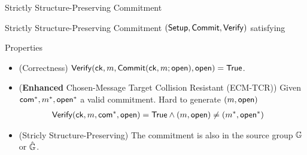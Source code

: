 \begin{frame}{Strictly Structure-Preserving Commitment~\cite{DBLP:conf/eurocrypt/AbeKOT15}}

  Strictly Structure-Preserving Commitment $({\mathsf{Setup}}, {\mathsf{Commit}}, {\mathsf{Verify}})$ satisfying \pause
  \begin{block}{Properties}
    \begin{itemize}
    \item {\color{blue}(Correctness)} ${\mathsf{Verify}}(\mathsf{ck}, m, {\mathsf{Commit}}(\mathsf{ck}, m; \mathsf{open}), \mathsf{open}) = \mathsf{True}$.
      \pause
    \item {\color{blue}(\textbf{Enhanced} Chosen-Message Target Collision Resistant (ECM-TCR))} Given $\mathsf{com}^*, m^*, \mathsf{open}^*$ a valid commitment. Hard to generate $(m, \mathsf{open})$ \st
      \begin{align*}
        {\mathsf{Verify}}(\mathsf{ck}, m, \mathsf{com}^*, \mathsf{open}) &= \mathsf{True} \wedge (m, \mathsf{open}) \neq (m^*, \mathsf{open}^*)
      \end{align*}
    \item {\color{blue}(Stricly Structure-Preserving)} The commitment is also in the source group $\mathbb{G}$ or $\hat{\mathbb{G}}$.
    \end{itemize}
  \end{block}


\end{frame}


